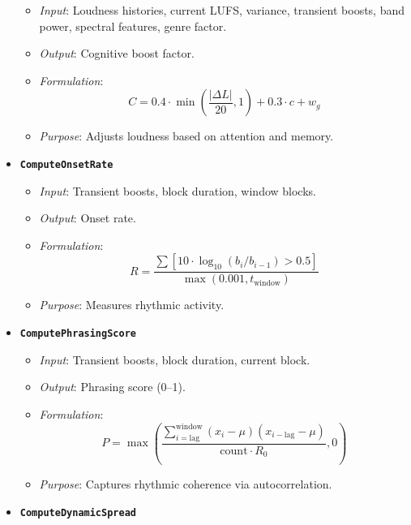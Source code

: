 \documentclass[11pt]{article}
\begin{document}
\begin{itemize}[label=$\bullet$]
    \begin{itemize}
      \item \textit{Input}: Loudness histories, current LUFS, variance, transient boosts, band power, spectral features, genre factor.
      \item \textit{Output}: Cognitive boost factor.
      \item \textit{Formulation}:
        \begin{equation}
        C = 0.4 \cdot \min\left(\frac{|\Delta L|}{20}, 1\right) + 0.3 \cdot c + w_g
        \end{equation}
      \item \textit{Purpose}: Adjusts loudness based on attention and memory.
    \end{itemize}
  \item \textbf{\texttt{ComputeOnsetRate}}
    \begin{itemize}
      \item \textit{Input}: Transient boosts, block duration, window blocks.
      \item \textit{Output}: Onset rate.
      \item \textit{Formulation}:
        \begin{equation}
        R = \frac{\sum [10 \cdot \log_{10}(b_i / b_{i-1}) > 0.5]}{\max(0.001, t_{\text{window}})}
        \end{equation}
      \item \textit{Purpose}: Measures rhythmic activity.
    \end{itemize}
  \item \textbf{\texttt{ComputePhrasingScore}}
    \begin{itemize}
      \item \textit{Input}: Transient boosts, block duration, current block.
      \item \textit{Output}: Phrasing score (0--1).
      \item \textit{Formulation}:
        \begin{equation}
        P = \max\left(\frac{\sum_{i=\text{lag}}^{\text{window}} (x_i - \mu)(x_{i-\text{lag}} - \mu)}{\text{count} \cdot R_0}, 0\right)
        \end{equation}
      \item \textit{Purpose}: Captures rhythmic coherence via autocorrelation.
    \end{itemize}
  \item \textbf{\texttt{ComputeDynamicSpread}}
    \begin{itemize}

\end{itemize}
\end{itemize}
\end{document}
